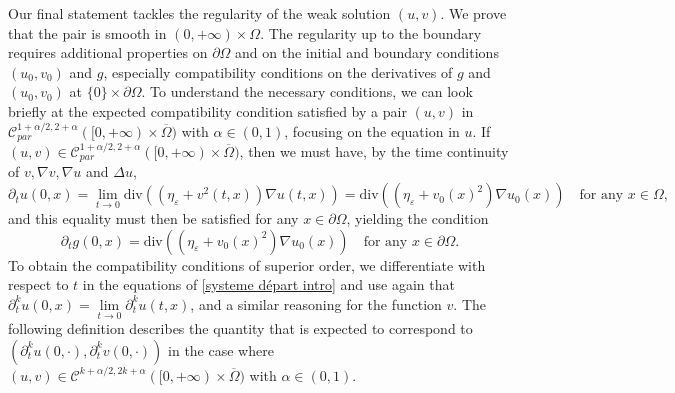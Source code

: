 \documentclass[reqno,12pt,twoside]{amsart}
\numberwithin{equation}{section} \numberwithin{theorem}{section}
\numberwithin{proposition}{section} \numberwithin{lemma}{section}
\numberwithin{corollary}{section}
\numberwithin{definition}{section} \numberwithin{remark}{section}
\begin{document}

\smallskip

Our final statement tackles the regularity of the weak solution $(u,v)$. We prove that the pair is smooth in $(0,+\infty) \times\Omega$. The regularity up to the boundary requires additional properties on $\partial\Omega$ and on the initial and boundary conditions $(u_0,v_0)$ and $g$, especially compatibility conditions on the derivatives of $g$ and $(u_0,v_0)$ at $\{0\}\times \partial\Omega$. To understand the necessary conditions, we can look briefly at the expected compatibility condition satisfied by a pair $(u,v)$ in $\mathcal{C}_{par}^{1+\alpha/2,2+\alpha}([0,+\infty)\times \overline{\Omega})$ with $\alpha \in (0,1)$, focusing on the equation in $u$. If $(u,v)\in \mathcal{C}_{par}^{1+\alpha/2,2+\alpha}([0,+\infty)\times \overline{\Omega})$, then we must have, by the time continuity of $v, \nabla v, \nabla u$ and $\Delta u$, 
\[\partial_t u(0,x) = \lim\limits_{t\rightarrow 0} \text{div}((\eta_\varepsilon +v^2(t,x)) \nabla u(t,x))= \text{div}((\eta_\varepsilon +v_0(x)^2)\nabla u_0(x))\quad \text{for any } x\in \Omega,\]
and this equality must then be satisfied for any $x\in \partial\Omega$, yielding the condition
%
\[\partial_t g(0,x) = \text{div}((\eta_\varepsilon +v_0(x)^2)\nabla u_0(x))\quad \text{for any } x\in \partial\Omega.\]
To obtain the compatibility conditions of superior order, we differentiate with respect to $t$ in the equations of \eqref{systeme départ intro} and use again that $\partial_t^k u(0,x) = \lim\limits_{t\rightarrow 0} \partial_t^k u(t,x)$, and a similar reasoning for the function $v$. The following definition describes the quantity that is expected to correspond to $(\partial_t^k u(0,\cdot), \partial_t^k v(0,\cdot))$ in the case where $(u,v) \in \mathcal{C}^{k+\alpha/2,2k+\alpha}([0,+\infty) \times \overline{\Omega})$ with $\alpha \in (0,1)$. 

%
%
\end{document}
